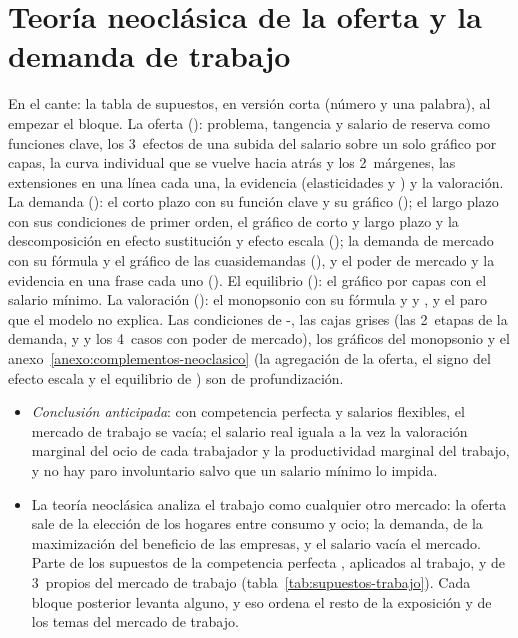 \documentclass[11pt]{article}
\begin{document}
\section{Teoría neoclásica de la oferta\cortetitulo{} y la demanda de trabajo}\label{sec:neoclasica}

\begin{notaopositor}
En el cante: la tabla de supuestos, en versión corta (número y una palabra), al empezar el bloque. La oferta (): problema, tangencia y salario de reserva como funciones clave, los 3~efectos de una subida del salario sobre un solo gráfico por capas, la curva individual que se vuelve hacia atrás y los 2~márgenes, las extensiones en una línea cada una, la evidencia (elasticidades y ) y la valoración. La demanda (): el corto plazo con su función clave y su gráfico (); el largo plazo con sus condiciones de primer orden, el gráfico de corto y largo plazo y la descomposición en efecto sustitución y efecto escala (); la demanda de mercado con su fórmula y el gráfico de las cuasidemandas (), y el poder de mercado y la evidencia en una frase cada uno (). El equilibrio (): el gráfico por capas con el salario mínimo. La valoración (): el monopsonio con su fórmula y  y , y el paro que el modelo no explica. Las condiciones de -, las cajas grises (las 2~etapas de la demanda,  y  y los 4~casos con poder de mercado), los gráficos del monopsonio y el anexo~\ref{anexo:complementos-neoclasico} (la agregación de la oferta, el signo del efecto escala y el equilibrio de ) son de profundización.
\end{notaopositor}

\begin{itemize}
\item \emph{Conclusión anticipada}: con competencia perfecta y salarios flexibles, el mercado de trabajo se vacía; el salario real iguala a la vez la valoración marginal del ocio de cada trabajador y la productividad marginal del trabajo, y no hay paro involuntario salvo que un salario mínimo lo impida.
\item La teoría neoclásica analiza el trabajo como cualquier otro mercado: la oferta sale de la elección de los hogares entre consumo y ocio; la demanda, de la maximización del beneficio de las empresas, y el salario vacía el mercado. Parte de los supuestos de la competencia perfecta , aplicados al trabajo, y de 3~propios del mercado de trabajo (tabla~\ref{tab:supuestos-trabajo}). Cada bloque posterior levanta alguno, y eso ordena el resto de la exposición y de los temas del mercado de trabajo.
\end{itemize}
\end{document}

